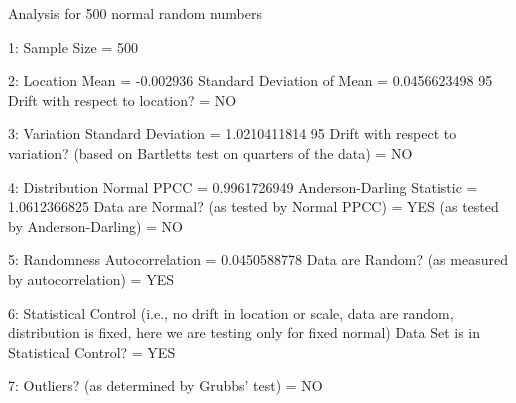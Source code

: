  
 
Analysis for 500 normal random numbers
 
1: Sample Size                           = 500
 
2: Location
   Mean                                  = -0.002936
   Standard Deviation of Mean            = 0.0456623498
   95%
   Drift with respect to location?       = NO
 
3: Variation
   Standard Deviation                    = 1.0210411814
   95%
   Drift with respect to variation?
   (based on Bartletts test on quarters
   of the data)                          = NO
 
4: Distribution
   Normal PPCC                           = 0.9961726949
   Anderson-Darling Statistic            = 1.0612366825
   Data are Normal?
     (as tested by Normal PPCC)          = YES
     (as tested by Anderson-Darling)     = NO
 
5: Randomness
   Autocorrelation                       = 0.0450588778
   Data are Random?
     (as measured by autocorrelation)    = YES
 
6: Statistical Control
   (i.e., no drift in location or scale,
   data are random, distribution is 
   fixed, here we are testing only for
   fixed normal)
   Data Set is in Statistical Control?   = YES
 
7: Outliers?
   (as determined by Grubbs' test)       = NO
 
